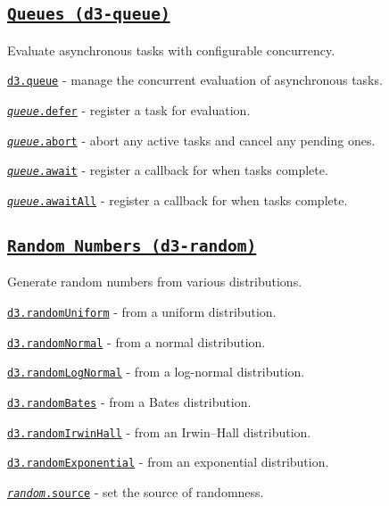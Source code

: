 \subsection*{\href{https://github.com/d3/d3-queue}{\tt Queues (d3-\/queue)}}

Evaluate asynchronous tasks with configurable concurrency.


\begin{DoxyItemize}
\item \href{https://github.com/d3/d3-queue/blob/master/README.md#queue}{\tt d3.\+queue} -\/ manage the concurrent evaluation of asynchronous tasks.
\item \href{https://github.com/d3/d3-queue/blob/master/README.md#queue_defer}{\tt {\itshape queue}.defer} -\/ register a task for evaluation.
\item \href{https://github.com/d3/d3-queue/blob/master/README.md#queue_abort}{\tt {\itshape queue}.abort} -\/ abort any active tasks and cancel any pending ones.
\item \href{https://github.com/d3/d3-queue/blob/master/README.md#queue_await}{\tt {\itshape queue}.await} -\/ register a callback for when tasks complete.
\item \href{https://github.com/d3/d3-queue/blob/master/README.md#queue_awaitAll}{\tt {\itshape queue}.await\+All} -\/ register a callback for when tasks complete.
\end{DoxyItemize}

\subsection*{\href{https://github.com/d3/d3-random}{\tt Random Numbers (d3-\/random)}}

Generate random numbers from various distributions.


\begin{DoxyItemize}
\item \href{https://github.com/d3/d3-random/blob/master/README.md#randomUniform}{\tt d3.\+random\+Uniform} -\/ from a uniform distribution.
\item \href{https://github.com/d3/d3-random/blob/master/README.md#randomNormal}{\tt d3.\+random\+Normal} -\/ from a normal distribution.
\item \href{https://github.com/d3/d3-random/blob/master/README.md#randomLogNormal}{\tt d3.\+random\+Log\+Normal} -\/ from a log-\/normal distribution.
\item \href{https://github.com/d3/d3-random/blob/master/README.md#randomBates}{\tt d3.\+random\+Bates} -\/ from a Bates distribution.
\item \href{https://github.com/d3/d3-random/blob/master/README.md#randomIrwinHall}{\tt d3.\+random\+Irwin\+Hall} -\/ from an Irwin–\+Hall distribution.
\item \href{https://github.com/d3/d3-random/blob/master/README.md#randomExponential}{\tt d3.\+random\+Exponential} -\/ from an exponential distribution.
\item \href{https://github.com/d3/d3-random/blob/master/README.md#random_source}{\tt {\itshape random}.source} -\/ set the source of randomness.
\end{DoxyItemize}

